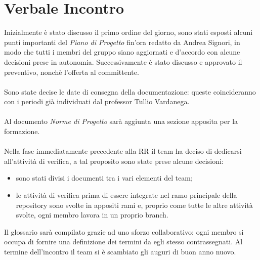 \section{Verbale Incontro}
    Inizialmente è stato discusso il primo ordine del giorno, sono stati esposti alcuni punti importanti del \textit{Piano di Progetto} fin'ora redatto da Andrea Signori, in modo che tutti i membri del gruppo siano aggiornati e d'accordo con alcune decisioni prese in autonomia. Successivamente è stato discusso e approvato il preventivo, nonchè l'offerta al committente.
    \\\\
    \noindent Sono state decise le date di consegna della documentazione: queste coincideranno con i periodi già individuati dal professor Tullio Vardanega.
    \\\\
    \noindent Al documento \textit{Norme di Progetto} sarà aggiunta una sezione apposita per la formazione.
    \\\\
    \noindent Nella fase immediatamente precedente alla RR il team ha deciso di dedicarsi all'attività di verifica, a tal proposito sono state prese alcune decisioni:
    \begin{itemize}
        \item sono stati divisi i documenti tra i vari elementi del team;
        \item le attività di verifica prima di essere integrate nel ramo principale della repository sono svolte in appositi rami e, proprio come tutte le altre attività svolte, ogni membro lavora in un proprio branch.
    \end{itemize}
    Il glossario sarà compilato grazie ad uno sforzo collaborativo: ogni membro si occupa di fornire una definizione dei termini da egli stesso contrassegnati.
    Al termine dell'incontro il team si è scambiato gli auguri di buon anno nuovo.
